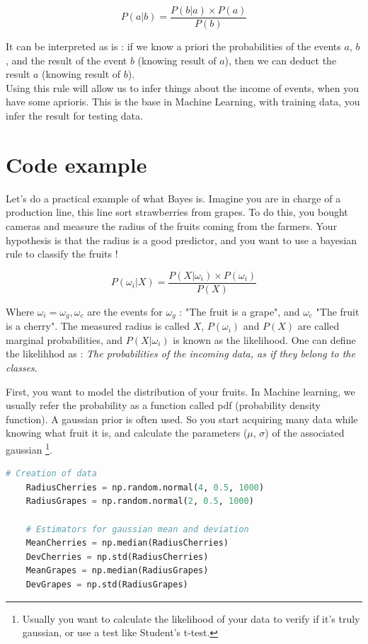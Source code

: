 \documentclass[runningheads,a4paper]{llncs}
\begin{document}
	\begin{equation}
	P(a|b) = \frac{P(b|a) \times P(a)}{P(b)} 
	\end{equation}
	
	It can be interpreted as is : if we know a priori the probabilities of the events $a$, $b$, and the result of the event $b$ (knowing result of $a$), then we can deduct the result $a$ (knowing result of $b$). \\ Using this rule will allow us to infer things about the income of events, when you have some aprioris. This is the base in Machine Learning, with training data, you infer the result for testing data.
		
	\section{Code example}\label{example}
	Let's do a practical example of what Bayes is. Imagine you are in charge of a production line, this line sort strawberries from grapes. To do this, you bought cameras and measure the radius of the fruits coming from the farmers. Your hypothesis is that the radius is a good predictor, and you want to use a bayesian rule to classify the fruits !
	
	\begin{equation}
	P(\omega_i|X) = \frac{P(X|\omega_i) \times P(\omega_i)}{P(X)} 
	\end{equation}
	
	Where $\omega_i = {\omega_g, \omega_c}$ are the events for $\omega_g$ : "The fruit is a grape", and $\omega_c$ "The fruit is a cherry". The measured radius is called $X$, $P(\omega_i)$ and $P(X)$ are called marginal probabilities, and $P(X|\omega_i)$ is known as the likelihood. One can define the likelihhod as : \textit{The probabilities of the incoming data, as if they belong to the classes}.
	
	\par
	First, you want to model the distribution of your fruits. In Machine learning, we usually refer the probability as a function called pdf (probability density function). A gaussian prior is often used. So you start acquiring many data while knowing what fruit it is, and calculate the parameters ($\mu$, $\sigma$) of the associated gaussian \footnote{Usually you want to calculate the likelihood of your data to verify if it's truly gaussian, or use a test like Student's t-test.}.
	
	\begin{lstlisting}[language=python]
	# Creation of data
	RadiusCherries = np.random.normal(4, 0.5, 1000)
	RadiusGrapes = np.random.normal(2, 0.5, 1000)
	
	# Estimators for gaussian mean and deviation
	MeanCherries = np.median(RadiusCherries)
	DevCherries = np.std(RadiusCherries)
	MeanGrapes = np.median(RadiusGrapes)
	DevGrapes = np.std(RadiusGrapes)
	\end{lstlisting}
	
\end{document}
